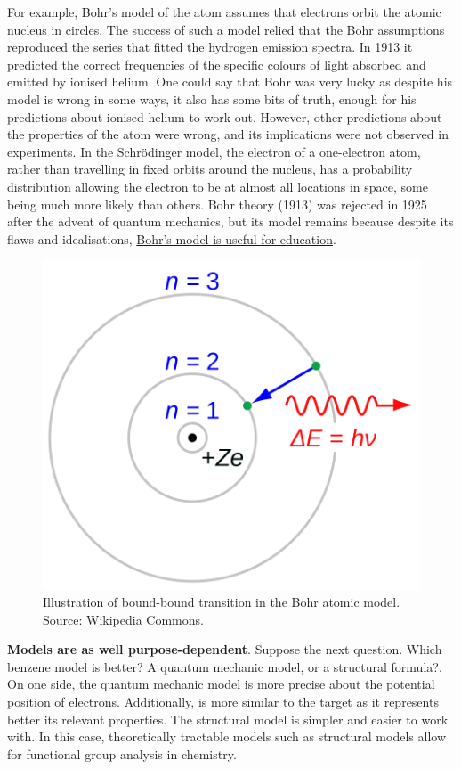 \documentclass[
]{book}
\begin{document}
For example, Bohr's model of the atom assumes that electrons orbit the atomic nucleus in circles. The success of such a model relied that the Bohr assumptions reproduced the series that fitted the hydrogen emission spectra. In 1913 it predicted the correct frequencies of the specific colours of light absorbed and emitted by ionised helium. One could say that Bohr was very lucky as despite his model is wrong in some ways, it also has some bits of truth, enough for his predictions about ionised helium to work out. However, other predictions about the properties of the atom were wrong, and its implications were not observed in experiments. In the Schrödinger model, the electron of a one-electron atom, rather than travelling in fixed orbits around the nucleus, has a probability distribution allowing the electron to be at almost all locations in space, some being much more likely than others. Bohr theory (1913) was rejected in 1925 after the advent of quantum mechanics, but its model remains because despite its flaws and idealisations, \href{https://blogs.scientificamerican.com/guest-blog/why-it-s-okay-to-teach-wrong-ideas-in-physics/}{Bohr's model is useful for education}.



\begin{figure}

{\centering \includegraphics[width=0.4\linewidth]{Figures/bohr-atom-model} 

}

\caption{Illustration of bound-bound transition in the Bohr atomic model. Source: \href{https://commons.wikimedia.org/wiki/File:Bohr_atom_model.svg}{Wikipedia Commons}.}\label{fig:bohr-model}
\end{figure}

\textbf{Models are as well purpose-dependent}. Suppose the next question. Which benzene model is better? A quantum mechanic model, or a structural formula?. On one side, the quantum mechanic model is more precise about the potential position of electrons. Additionally, is more similar to the target as it represents better its relevant properties. The structural model is simpler and easier to work with. In this case, theoretically tractable models such as structural models allow for functional group analysis in chemistry.
\end{document}
